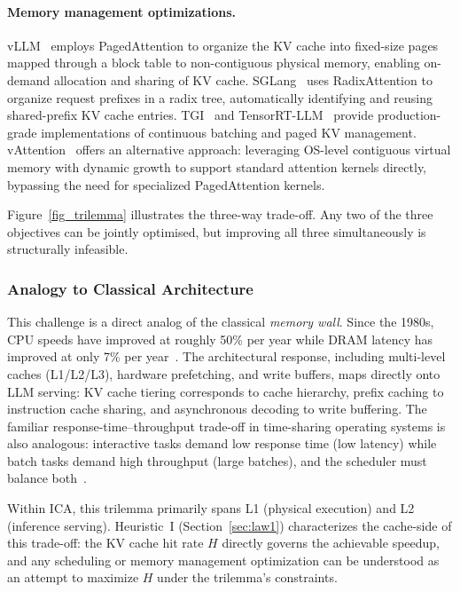 \paragraph{Memory management optimizations.}
vLLM~\cite{kwon2023pagedattention,vllm_docs_2026} employs PagedAttention to organize the KV cache into fixed-size pages mapped through a block table to non-contiguous physical memory, enabling on-demand allocation and sharing of KV cache.
SGLang~\cite{sglang2024,sglang_docs_2026} uses RadixAttention to organize request prefixes in a radix tree, automatically identifying and reusing shared-prefix KV cache entries.
TGI~\cite{tgi_docs_2026} and TensorRT-LLM~\cite{tensorrtllm_docs_2026} provide production-grade implementations of continuous batching and paged KV management.
vAttention~\cite{prabhu2024vattention} offers an alternative approach: leveraging OS-level contiguous virtual memory with dynamic growth to support standard attention kernels directly, bypassing the need for specialized PagedAttention kernels.

Figure~\ref{fig_trilemma} illustrates the three-way trade-off. Any two of the three objectives can be jointly optimised, but improving all three simultaneously is structurally infeasible.


\subsubsection{Analogy to Classical Architecture}
This challenge is a direct analog of the classical \emph{memory wall}.
Since the 1980s, CPU speeds have improved at roughly 50\% per year while DRAM latency has improved at only 7\% per year~\cite{hennessy2017quantitative}.
The architectural response, including multi-level caches (L1/L2/L3), hardware prefetching, and write buffers, maps directly onto LLM serving: KV cache tiering corresponds to cache hierarchy, prefix caching to instruction cache sharing, and asynchronous decoding to write buffering.
The familiar response-time--throughput trade-off in time-sharing operating systems is also analogous: interactive tasks demand low response time (low latency) while batch tasks demand high throughput (large batches), and the scheduler must balance both~\cite{ostep_2023}.

Within ICA, this trilemma primarily spans L1 (physical execution) and L2 (inference serving).
Heuristic~I (Section~\ref{sec:law1}) characterizes the cache-side of this trade-off: the KV cache hit rate $H$ directly governs the achievable speedup, and any scheduling or memory management optimization can be understood as an attempt to maximize $H$ under the trilemma's constraints.


